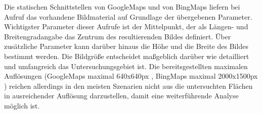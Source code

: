 Die statischen Schnittstellen von GoogleMaps und von BingMaps liefern bei Aufruf das vorhandene Bildmaterial auf Grundlage der übergebenen Parameter. Wichtigster Parameter dieser Aufrufe ist der Mittelpunkt, der als Längen- und Breitengradangabe das Zentrum des resultierenden Bildes definiert. Über zusätzliche Parameter kann darüber hinaus die Höhe und die Breite des Bildes bestimmt werden. Die Bildgröße entscheidet maßgeblich darüber wie detailliert und umfangreich das Untersuchungsgebiet ist. Die bereitsgestellten maximalen Auflösungen (GoogleMaps maximal 640x640px \cite{googleusagelimits}, BingMaps maximal 2000x1500px \cite{bingstaticmap}) reichen allerdings in den meisten Szenarien nicht aus die untersuchten Flächen in ausreichender Auflösung darzustellen, damit eine weiterführende Analyse möglich ist.\\

